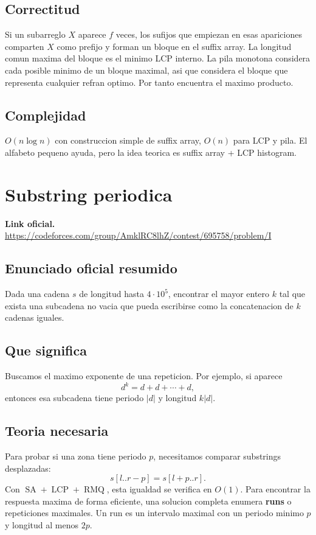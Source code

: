 \documentclass[10pt]{article}
\newcommand{\bigO}{O}
\newcommand{\SA}{\operatorname{SA}}
\newcommand{\LCP}{\operatorname{LCP}}
\newcommand{\RMQ}{\operatorname{RMQ}}
\begin{document}
\subsection{Correctitud}
Si un subarreglo $X$ aparece $f$ veces, los sufijos que empiezan en esas
apariciones comparten $X$ como prefijo y forman un bloque en el suffix array.
La longitud comun maxima del bloque es el minimo LCP interno. La pila monotona
considera cada posible minimo de un bloque maximal, asi que considera el bloque
que representa cualquier refran optimo. Por tanto encuentra el maximo producto.

\subsection{Complejidad}
$\bigO(n\log n)$ con construccion simple de suffix array, $\bigO(n)$ para LCP y
pila. El alfabeto pequeno ayuda, pero la idea teorica es suffix array + LCP
histogram.

\newpage

\section{Substring periodica}
\textbf{Link oficial.} \url{https://codeforces.com/group/AmklRC8lhZ/contest/695758/problem/I}

\subsection{Enunciado oficial resumido}
Dada una cadena $s$ de longitud hasta $4\cdot 10^5$, encontrar el mayor entero
$k$ tal que exista una subcadena no vacia que pueda escribirse como la
concatenacion de $k$ cadenas iguales.

\subsection{Que significa}
Buscamos el maximo exponente de una repeticion. Por ejemplo, si aparece
\[
d^k = d+d+\cdots+d,
\]
entonces esa subcadena tiene periodo $|d|$ y longitud $k|d|$.

\subsection{Teoria necesaria}
Para probar si una zona tiene periodo $p$, necesitamos comparar substrings
desplazadas:
\[
s[l..r-p]=s[l+p..r].
\]
Con $\SA+\LCP+\RMQ$, esta igualdad se verifica en $\bigO(1)$. Para encontrar
la respuesta maxima de forma eficiente, una solucion completa enumera
\textbf{runs} o repeticiones maximales. Un run es un intervalo maximal con un
periodo minimo $p$ y longitud al menos $2p$.
\end{document}
